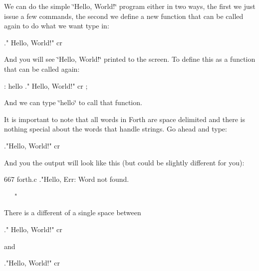 We can do the simple \char`\"{}\-Hello, World!\char`\"{} program either in two ways, the first we just issue a few commands, the second we define a new function that can be called again to do what we want type in\-:

\begin{DoxyVerb}    ." Hello, World!" cr\end{DoxyVerb}


And you will see \char`\"{}\-Hello, World!\char`\"{} printed to the screen. To define this as a function that can be called again\-:

\begin{DoxyVerb}    : hello ." Hello, World!" cr ;\end{DoxyVerb}


And we can type \char`\"{}hello\char`\"{} to call that function.

It is important to note that all words in Forth are space delimited and there is nothing special about the words that handle strings. Go ahead and type\-:

\begin{DoxyVerb}    ."Hello, World!" cr\end{DoxyVerb}


And you the output will look like this (but could be slightly different for you)\-:

\begin{DoxyVerb}    667   forth.c
    ."Hello,
    Err: Word not found.

~~~"

There is a different of a single space between\end{DoxyVerb}
 \begin{DoxyVerb}." Hello, World!" cr

and

."Hello, World!" cr
\end{DoxyVerb}


